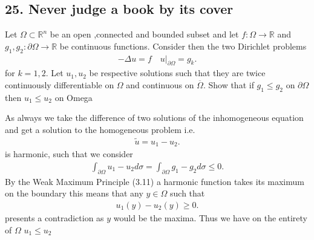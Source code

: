 \subsection*{25. Never judge a book by its cover}
Let $\Omega  \subset \mathbb{R}^{n} $ be an open ,connected and bounded subset and let 
$f : \Omega  \to \mathbb{R}$ and $g_{1},g_{2} : \partial \Omega  \to \mathbb{R}$ be continuous functions.
Consider then the two Dirichlet problems
\begin{align*}
  - \Delta u  = f \quad u \rvert_{\partial \Omega } = g_k
.\end{align*}
for $k=1,2$. Let $u_{1},u_{2}$ be respective solutions such that they are twice continuously differentiable
on $\Omega $ and continuous on $\overline{\Omega } $. Show that if $g_{1}\le g_{2}$ on $\partial \Omega $ then $u_{1}\le u_{2}$ on Omega
\begin{solution}
 As always we take the difference of two solutions of the inhomogeneous equation and get a solution to the homogeneous problem i.e.
 \begin{align*}
  \tilde{u} = u_{1} - u_{2} 
 .\end{align*}
 is harmonic, such that we consider 
 \begin{align*}
   \int_{\partial \Omega } u_{1} - u_{2} d\sigma  = \int_{\partial \Omega } g_{1}-g_{2} d\sigma  \le  0 
 .\end{align*}
 By the Weak Maximum Principle (3.11) a harmonic function takes its maximum on the boundary this means that any $y \in  \Omega $ such that 
 \begin{align*}
  u_{1}(y) - u_{2}(y) \ge 0
 .\end{align*}
 presents a contradiction as $y$ would be the maxima. Thus we have on the entirety of $\Omega $ $u_{1}\le u_{2}$
\end{solution}
